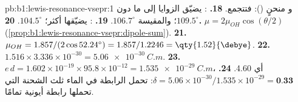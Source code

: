 \begin{solution}{pb:b1:lewis-resonance-vsepr:1}
و منحنٍ (): فتتجمع.
\textbf{18.} : يضيّق  الزوايا إلى ما دون
$109.5^\circ$؛ والمقيسة $106.7^\circ$.
\textbf{19.} : يضيّقها  أكثر؛ $104.5^\circ$.
\textbf{20.} $\mu = 2\mu_{OH}\cos(\theta/2)$
(\cref{prop:b1:lewis-resonance-vsepr:dipole-sum}).
\textbf{21.} $\mu_{OH} = 1.857/(2\cos 52.24^\circ) = 1.857/1.2246 =
\qty{1.52}{\debye}$.
\textbf{22.} $1.516 \times 3.336 \times 10^{-30} = \qty{5.06e-30}{C.m}$.
\textbf{23.} $e\,d = 1.602 \times 10^{-19} \times 95.8 \times 10^{-12} =
\qty{1.535e-29}{C.m}$، أي \qty{4.60}{\debye}.
\textbf{24.} $\delta = 5.06 \times 10^{-30}/1.535 \times 10^{-29} =
\textbf{0.33}$: تحمل الرابطة  في الماء ثلث الشحنة التي
تحملها رابطة أيونية تمامًا.
\end{solution}
